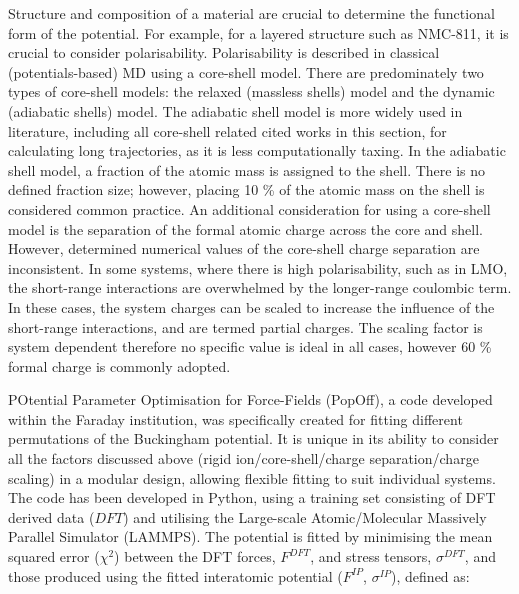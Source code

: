 \documentclass[../main.tex]{subfiles}
\begin{document}
Structure and composition of a material are crucial to determine the functional form of the potential. For example, for a layered structure such as NMC-811, it is crucial to consider polarisability. Polarisability is described in classical (potentials-based) MD using a core-shell model. There are predominately two types of core-shell models: the relaxed (massless shells) model \cite{Lindan_1993} and the dynamic (adiabatic shells) model.\cite{Mitchell_1993} The adiabatic shell model is more widely used in literature, including all core-shell related cited works in this section,\cite{Hart1998, Fisher2010, Lewis_1985,Ammundsen1999, Kerisit2014, he2019thermal,lee2012atomistic} for calculating long trajectories, as it is less computationally taxing. In the adiabatic shell model, a fraction of the atomic mass is assigned to the shell. There is no defined fraction size; however, placing 10 \% of the atomic mass on the shell is considered common practice. \cite{PLIMPTON19951,todorov2006dl_poly_3} An additional consideration for using a core-shell model is the separation of the formal atomic charge across the core and shell. However, determined numerical values of the core-shell charge separation are inconsistent.\cite{wang2014molecular,escribano2017enhancing, lee2012atomistic,Lee2013_lithium,dai2019comparison} In some systems, where there is high polarisability, such as in LMO, the short-range interactions are overwhelmed by the longer-range coulombic term. In these cases, the system charges can be scaled to increase the influence of the short-range interactions, and are termed partial charges. The scaling factor is system dependent therefore no specific value is ideal in all cases, however 60 \% formal charge is commonly adopted. \cite{pedone2006potentials}

POtential Parameter Optimisation for Force-Fields (PopOff),\cite{Morgan2021PopOff} a code developed within the Faraday institution, was specifically created for fitting different permutations of the Buckingham potential. It is unique in its ability to consider all the factors discussed above (rigid ion/core-shell/charge separation/charge scaling) in a modular design, allowing flexible fitting to suit individual systems. The code has been developed in Python, using a training set consisting of DFT derived data ($DFT$) and utilising the Large-scale Atomic/Molecular Massively Parallel Simulator (LAMMPS).\cite{PLIMPTON19951} The potential is fitted by minimising the mean squared error ($\chi^2$) between the DFT forces, $F^{DFT}$, and stress tensors, $\sigma^{DFT}$, and those produced using the fitted interatomic potential ($F^{IP}$, $\sigma^{IP}$), defined as:
\end{document}
